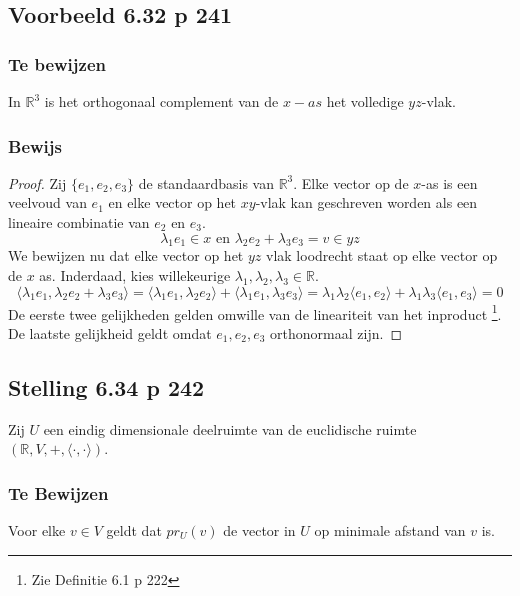 \documentclass[lineaire_algebra_oplossingen.tex]{subfiles}
\begin{document}
\subsection{Voorbeeld 6.32 p 241}
\subsubsection*{Te bewijzen}
In $\mathbb{R}^3$ is het orthogonaal complement van de $x-as$ het volledige $yz$-vlak.
\subsubsection*{Bewijs}
\begin{proof}
Zij $\{e_1,e_2,e_3\}$ de standaardbasis van $\mathbb{R}^3$. Elke vector op de $x$-as is een veelvoud van $e_1$ en elke vector op het $xy$-vlak kan geschreven worden als een lineaire combinatie van $e_2$ en $e_3$.
\[
\lambda_1e_1 \in x \text{ en }\lambda_2e_2 + \lambda_3e_3 = v\in yz
\]
We bewijzen nu dat elke vector op het $yz$ vlak loodrecht staat op elke vector op de $x$ as.
Inderdaad, kies willekeurige $\lambda_1,\lambda_2,\lambda_3 \in \mathbb{R}$.
\[
\langle \lambda_1e_1 , \lambda_2e_2 + \lambda_3e_3 \rangle = \langle \lambda_1e_1 , \lambda_2e_2
\rangle + \langle \lambda_1e_1 , \lambda_3e_3 \rangle = \lambda_1\lambda_2\langle e_1 , e_2
\rangle + \lambda_1\lambda_3\langle e_1 , e_3 \rangle = 0
\]
De eerste twee gelijkheden gelden omwille van de lineariteit van het inproduct \footnote{Zie Definitie 6.1 p 222}.
De laatste gelijkheid geldt omdat $e_1,e_2,e_3$ orthonormaal zijn.
\end{proof}

\subsection{Stelling 6.34 p 242}
Zij $U$ een eindig dimensionale deelruimte van de euclidische ruimte $(\mathbb{R}, V,+, \langle \cdot,\cdot \rangle)$.
\subsubsection*{Te Bewijzen}
Voor elke $v\in V$ geldt dat $pr_U(v)$ de vector in $U$ op minimale afstand van $v$ is.
\end{document}
